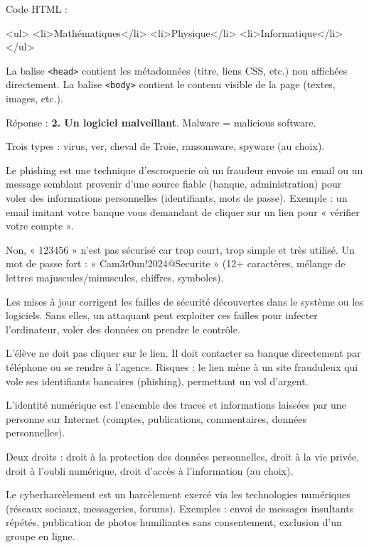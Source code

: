 Code HTML :
\begin{ccode}
<ul>
  <li>Mathématiques</li>
  <li>Physique</li>
  <li>Informatique</li>
</ul>
\end{ccode}

La balise \texttt{<head>} contient les métadonnées (titre, liens CSS, etc.) non affichées directement. La balise \texttt{<body>} contient le contenu visible de la page (textes, images, etc.).

Réponse : \textbf{2. Un logiciel malveillant}. Malware = malicious software.

Trois types : virus, ver, cheval de Troie, ransomware, spyware (au choix).

Le phishing est une technique d'escroquerie où un fraudeur envoie un email ou un message semblant provenir d'une source fiable (banque, administration) pour voler des informations personnelles (identifiants, mots de passe). Exemple : un email imitant votre banque vous demandant de cliquer sur un lien pour « vérifier votre compte ».

Non, « 123456 » n'est pas sécurisé car trop court, trop simple et très utilisé. Un mot de passe fort : « Cam3r0un!2024@Securite » (12+ caractères, mélange de lettres majuscules/minuscules, chiffres, symboles).

Les mises à jour corrigent les failles de sécurité découvertes dans le système ou les logiciels. Sans elles, un attaquant peut exploiter ces failles pour infecter l'ordinateur, voler des données ou prendre le contrôle.

L'élève ne doit pas cliquer sur le lien. Il doit contacter sa banque directement par téléphone ou se rendre à l'agence. Risques : le lien mène à un site frauduleux qui vole ses identifiants bancaires (phishing), permettant un vol d'argent.

L'identité numérique est l'ensemble des traces et informations laissées par une personne sur Internet (comptes, publications, commentaires, données personnelles).

Deux droits : droit à la protection des données personnelles, droit à la vie privée, droit à l'oubli numérique, droit d'accès à l'information (au choix).

Le cyberharcèlement est un harcèlement exercé via les technologies numériques (réseaux sociaux, messageries, forums). Exemples : envoi de messages insultants répétés, publication de photos humiliantes sans consentement, exclusion d'un groupe en ligne.

